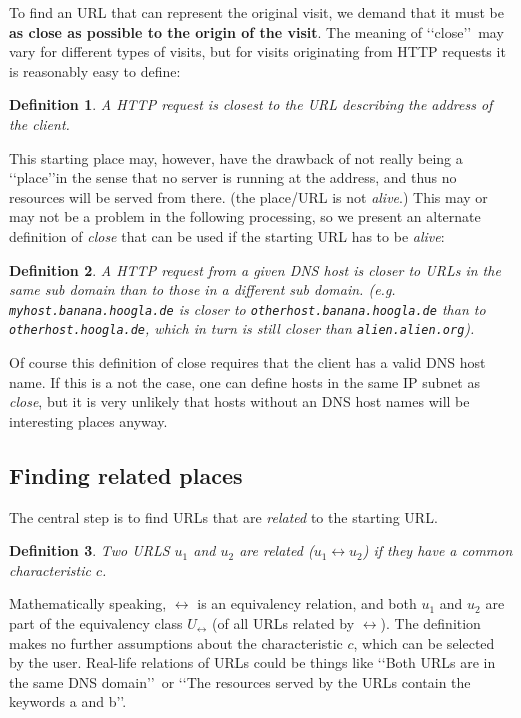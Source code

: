 \documentclass[a4paper]{danarticle}
\newtheorem*{definition}{Definition}
\begin{document}
       To find an URL that can represent the original visit, we demand
       that it must be \textbf{as close as possible to the origin of the visit}.
       The meaning of \lq\lq close\rq\rq\ may vary for
       different types of visits, but for visits originating from HTTP requests
       it is reasonably easy to define:
       \begin{definition}
       A HTTP request is closest to the URL describing the address of the
       client.
       \end{definition}
       This starting place may, however, have the drawback of not really 
       being a
       \lq\lq place\rq\rq in the sense that no server is running at the
       address, and thus no resources will be served from there. (the place/URL 
       is not \textit{alive}.) This may or may not be a problem in
       the following processing, so we present an alternate definition of
       \textit{close} that can be used if the starting URL has to be
       \textit{alive}:
       \begin{definition}
       A HTTP request from a given DNS host is closer to URLs in the same
       sub domain than to those in a different sub domain. (e.g. 
       \verb$myhost.banana.hoogla.de$ is closer to 
       \verb$otherhost.banana.hoogla.de$
       than to \verb$otherhost.hoogla.de$, which in turn is still closer than
       \verb$alien.alien.org$).
       \end{definition}
       Of course this definition of close requires that the client has a valid
       DNS host name. If this is a not the case, 
       one can define hosts in the same IP
       subnet as \textit{close}, but it is very unlikely that hosts without an
       DNS host names will be interesting places anyway.
     \subsection*{Finding related places}
       The central step is to find URLs that are \textit{related} to the
       starting URL. 
       \begin{definition}
       Two URLS $ u_1 $ and $ u_2 $ are \textit{related} 
       ($ u_1 \leftrightarrow u_2 $) if they \textit{have a common
       characteristic} $ c $. 
       \end{definition}
       Mathematically speaking, $ \leftrightarrow $ is an equivalency relation,
       and both $ u_1 $ and $ u_2 $ are part of the equivalency class 
       $ U_{\leftrightarrow} $
       (of all URLs related by $ \leftrightarrow $). The definition makes no
       further assumptions about the characteristic $ c $, which can be selected
       by the user. Real-life relations of URLs could be things like 
       \lq\lq Both URLs are in the same DNS domain\rq\rq\ or \lq\lq The
       resources served by the URLs contain the keywords a and b\rq\rq . 
       
\end{document}
